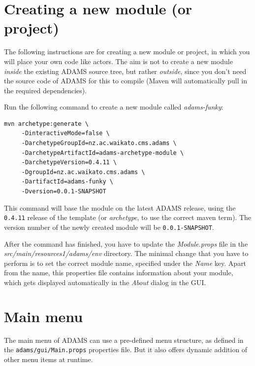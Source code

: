 \section{Creating a new module (or project)}
The following instructions are for creating a new module or project, in
which you will place your own code like actors. The aim is not to create
a new module \textit{inside} the existing ADAMS source tree, but rather \textit{outside},
since you don't need the source code of ADAMS for this to compile (Maven will
automatically pull in the required dependencies).

Run the following command to create a new module called \textit{adams-funky}:
\begin{verbatim}
mvn archetype:generate \
     -DinteractiveMode=false \
     -DarchetypeGroupId=nz.ac.waikato.cms.adams \
     -DarchetypeArtifactId=adams-archetype-module \
     -DarchetypeVersion=0.4.11 \
     -DgroupId=nz.ac.waikato.cms.adams \
     -DartifactId=adams-funky \
     -Dversion=0.0.1-SNAPSHOT
\end{verbatim}
This command will base the module on the latest ADAMS release,
using the \texttt{0.4.11} release of the template (or \textit{archetype}, to use
the correct maven term). The version number of the newly created module will be
\texttt{0.0.1-SNAPSHOT}.

After the command has finished, you have to update the \textit{Module.props}
file in the \textit{src/main/resources1/adams/env} directory. The minimal change
that you have to perform is to set the correct module name, specified under the
\textit{Name} key. Apart from the name, this properties file contains
information about your module, which gets displayed automatically in the
\textit{About} dialog in the GUI.

\section{Main menu}
\label{mainmenu}
The main menu of ADAMS can use a pre-defined menu structure, as defined in the
\texttt{adams/gui/Main.props} properties file. But it also offers dynamic
addition of other menu items at runtime.

